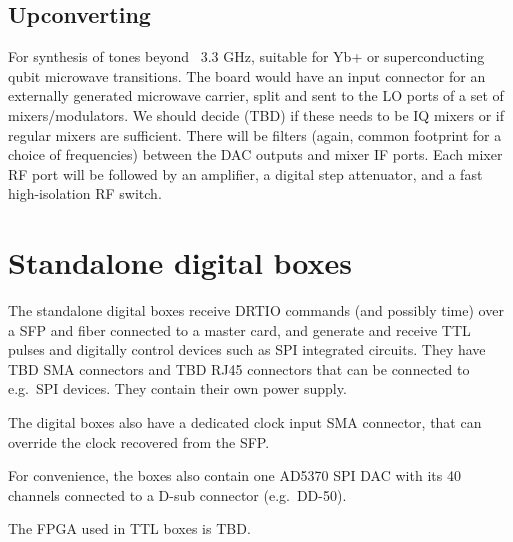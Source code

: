 \documentclass[11pt]{paper}
\begin{document}
\subsection{Upconverting}
For synthesis of tones beyond ~3.3 GHz, suitable for Yb+ or superconducting qubit microwave transitions. The board would have an input connector for an externally generated microwave carrier, split and sent to the LO ports of a set of mixers/modulators. We should decide (TBD) if these needs to be IQ mixers or if regular mixers are sufficient. There will be filters (again, common footprint for a choice of frequencies) between the DAC outputs and mixer IF ports. Each mixer RF port will be followed by an amplifier, a digital step attenuator, and a fast high-isolation RF switch.

\section{Standalone digital boxes}
The standalone digital boxes receive DRTIO commands (and possibly time) over a SFP and fiber connected to a master card, and generate and receive TTL pulses and digitally control devices such as SPI integrated circuits. They have TBD SMA connectors and TBD RJ45 connectors that can be connected to e.g.\ SPI devices. They contain their own power supply.

The digital boxes also have a dedicated clock input SMA connector, that can override the clock recovered from the SFP.

For convenience, the boxes also contain one AD5370 SPI DAC with its 40 channels connected to a D-sub connector (e.g.\ DD-50).

The FPGA used in TTL boxes is TBD.
\end{document}
